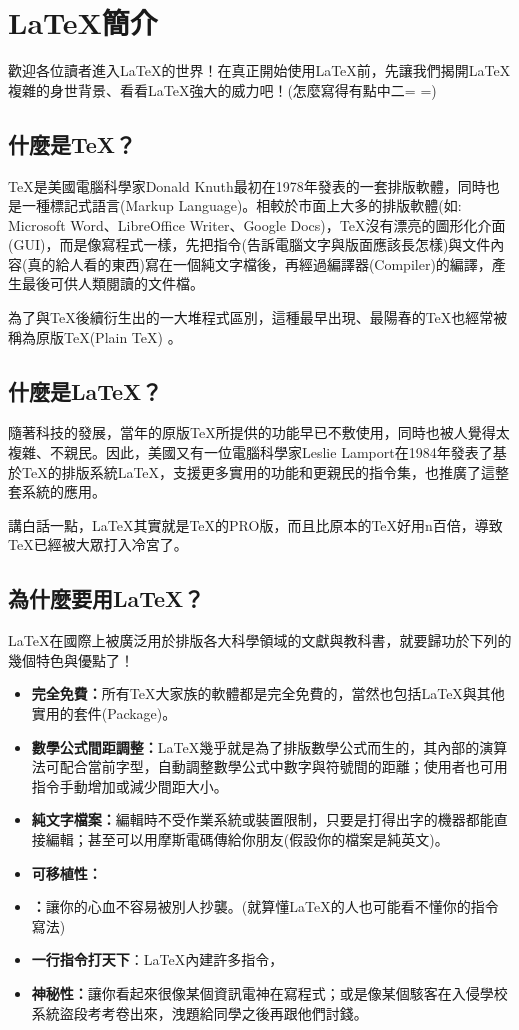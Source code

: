 \documentclass{../indiv}
\begin{document}
	\onlyifstandalone{\makebarother}
	\chapter{\LaTeX 簡介}
	歡迎各位讀者進入\LaTeX 的世界！在真正開始使用\LaTeX 前，先讓我們揭開\LaTeX 複雜的身世背景、看看\LaTeX 強大的威力吧！(怎麼寫得有點中二= =)
	
	\section{什麼是\TeX ？}
	\TeX 是美國電腦科學家Donald Knuth最初在1978年發表的一套排版軟體，同時也是一種標記式語言(Markup Language)。相較於市面上大多的排版軟體(如: Microsoft Word、LibreOffice Writer、Google Docs)，\TeX 沒有漂亮的圖形化介面(GUI)，而是像寫程式一樣，先把指令(告訴電腦文字與版面應該長怎樣)與文件內容(真的給人看的東西)寫在一個純文字檔後，再經過編譯器(Compiler)的編譯，產生最後可供人類閱讀的文件檔。
	
	為了與\TeX 後續衍生出的一大堆程式區別，這種最早出現、最陽春的\TeX 也經常被稱為原版\TeX (Plain \TeX) 。
	
	\section{什麼是\LaTeX ？}
	隨著科技的發展，當年的原版\TeX 所提供的功能早已不敷使用，同時也被人覺得太複雜、不親民。因此，美國又有一位電腦科學家Leslie Lamport在1984年發表了基於\TeX 的排版系統\LaTeX ，支援更多實用的功能和更親民的指令集，也推廣了這整套系統的應用。 
	
	講白話一點，\LaTeX 其實就是\TeX 的PRO版，而且比原本的\TeX 好用n百倍，導致\TeX 已經被大眾打入冷宮了。
	
	\newpage
	\section{為什麼要用\LaTeX ？}
	\LaTeX 在國際上被廣泛用於排版各大科學領域的文獻與教科書，就要歸功於下列的幾個特色與優點了！
	\begin{itemize}
		\item \textbf{完全免費：}所有\TeX 大家族的軟體都是完全免費的，當然也包括\LaTeX 與其他實用的套件(Package)。
		\item \textbf{數學公式間距調整：}\LaTeX 幾乎就是為了排版數學公式而生的，其內部的演算法可配合當前字型，自動調整數學公式中數字與符號間的距離；使用者也可用指令手動增加或減少間距大小。
		\item \textbf{純文字檔案：}編輯時不受作業系統或裝置限制，只要是打得出字的機器都能直接編輯；甚至可以用摩斯電碼傳給你朋友(假設你的檔案是純英文)。
		\item \textbf{可移植性：}
		\item \textbf{：}讓你的心血不容易被別人抄襲。(就算懂\LaTeX 的人也可能看不懂你的指令寫法)
		\item \textbf{一行指令打天下}：\LaTeX 內建許多指令，
		\item \textbf{神秘性：}讓你看起來很像某個資訊電神在寫程式；或是像某個駭客在入侵學校系統盜段考考卷出來，洩題給同學之後再跟他們討錢。
		
	\end{itemize}
	
\end{document}
